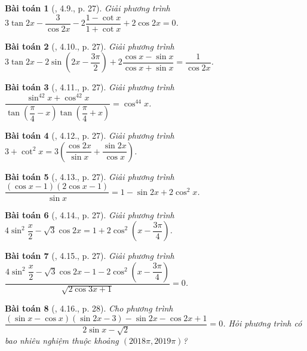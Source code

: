 \documentclass{article}
\newtheorem{baitoan}{Bài toán}
\begin{document}
\begin{baitoan}[\cite{Hung_nang_cao_phat_trien_Toan_11_tap_1}, 4.9., p. 27]
	Giải phương trình $3\tan2x - \dfrac{3}{\cos2x} - 2\dfrac{1 - \cot x}{1 + \cot x} + 2\cos2x = 0$.
\end{baitoan}

\begin{baitoan}[\cite{Hung_nang_cao_phat_trien_Toan_11_tap_1}, 4.10., p. 27]
	Giải phương trình $3\tan2x - 2\sin\left(2x - \dfrac{3\pi}{2}\right) + 2\dfrac{\cos x - \sin x}{\cos x + \sin x} = \dfrac{1}{\cos2x}$.
\end{baitoan}

\begin{baitoan}[\cite{Hung_nang_cao_phat_trien_Toan_11_tap_1}, 4.11., p. 27]
	Giải phương trình $\dfrac{\sin^42x + \cos^42x}{\tan\left(\dfrac{\pi}{4} - x\right)\tan\left(\dfrac{\pi}{4} + x\right)} = \cos^44x$.
\end{baitoan}

\begin{baitoan}[\cite{Hung_nang_cao_phat_trien_Toan_11_tap_1}, 4.12., p. 27]
	Giải phương trình $3 + \cot^2x = 3\left(\dfrac{\cos2x}{\sin x} + \dfrac{\sin2x}{\cos x}\right)$.
\end{baitoan}

\begin{baitoan}[\cite{Hung_nang_cao_phat_trien_Toan_11_tap_1}, 4.13., p. 27]
	Giải phương trình $\dfrac{(\cos x - 1)(2\cos x - 1)}{\sin x} = 1 - \sin2x + 2\cos^2x$.
\end{baitoan}

\begin{baitoan}[\cite{Hung_nang_cao_phat_trien_Toan_11_tap_1}, 4.14., p. 27]
	Giải phương trình $4\sin^2\dfrac{x}{2} - \sqrt{3}\cos2x = 1 + 2\cos^2\left(x - \dfrac{3\pi}{4}\right)$.
\end{baitoan}

\begin{baitoan}[\cite{Hung_nang_cao_phat_trien_Toan_11_tap_1}, 4.15., p. 27]
	Giải phương trình $\dfrac{4\sin^2\dfrac{x}{2} - \sqrt{3}\cos2x - 1 - 2\cos^2\left(x - \dfrac{3\pi}{4}\right)}{\sqrt{2\cos3x + 1}} = 0$.
\end{baitoan}

\begin{baitoan}[\cite{Hung_nang_cao_phat_trien_Toan_11_tap_1}, 4.16., p. 28]
	Cho phương trình $\dfrac{(\sin x - \cos x)(\sin2x - 3) - \sin2x - \cos2x + 1}{2\sin x - \sqrt{2}} = 0$. Hỏi phương trình có bao nhiêu nghiệm thuộc khoảng $(2018\pi,2019\pi)$?
\end{baitoan}
\end{document}
